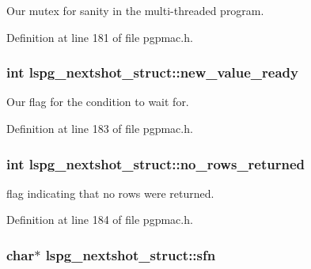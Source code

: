 Our mutex for sanity in the multi-\/threaded program. 



Definition at line 181 of file pgpmac.\-h.

\hypertarget{structlspg__nextshot__struct_adb8da14444b98f556dba9420dd4666dc}{
\subsubsection[{new\-\_\-value\-\_\-ready}]{\setlength{\rightskip}{0pt plus 5cm}int lspg\-\_\-nextshot\-\_\-struct\-::new\-\_\-value\-\_\-ready}}\label{structlspg__nextshot__struct_adb8da14444b98f556dba9420dd4666dc}


Our flag for the condition to wait for. 



Definition at line 183 of file pgpmac.\-h.

\hypertarget{structlspg__nextshot__struct_abc9242805729f70b83df79706c394c71}{
\subsubsection[{no\-\_\-rows\-\_\-returned}]{\setlength{\rightskip}{0pt plus 5cm}int lspg\-\_\-nextshot\-\_\-struct\-::no\-\_\-rows\-\_\-returned}}\label{structlspg__nextshot__struct_abc9242805729f70b83df79706c394c71}


flag indicating that no rows were returned. 



Definition at line 184 of file pgpmac.\-h.

\hypertarget{structlspg__nextshot__struct_a03252bba597b081edc9d08b20b558cc7}{
\subsubsection[{sfn}]{\setlength{\rightskip}{0pt plus 5cm}char$\ast$ lspg\-\_\-nextshot\-\_\-struct\-::sfn}}\label{structlspg__nextshot__struct_a03252bba597b081edc9d08b20b558cc7}


